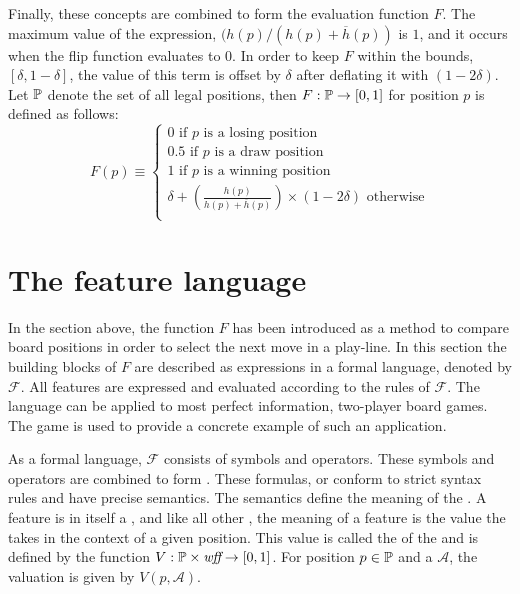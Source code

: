 Finally, these concepts are combined to form the evaluation function $F$.  The maximum value of the expression, $(h(p) / (h(p)+\overline{h}(p))$ is $1$, and it occurs when the flip function evaluates to $0$.  In order to keep $F$ within the bounds, $[\delta,1-\delta]$, the value of this term is offset by $\delta$ after deflating it with $(1 - 2\delta)$.  Let $\mathbb{P}$ denote the set of all legal positions, then $F : \mathbb{P} \rightarrow [0,1]$ for position $p$ is defined as follows:
\begin{equation}
F(p) \equiv \left\{ 
					\begin{array}{l}
						0 \mbox{ if $p$ is a losing position} \\
						0.5 \mbox{ if $p$ is a draw position} \\
						1 \mbox{ if $p$ is a winning position} \\
						 \delta + \left( \frac{h(p)} {h(p)+\overline{h}(p)}\right) \times(1-2\delta) \mbox{ otherwise} \\
					\end{array}
			\right. 
\label{eq:evaluation}
\end{equation}

\section{The feature language}
\label{sec:knowledge-language}
In the section above, the function $F$ has been introduced as a method to compare board positions in order to select the next move in a play-line.  In this section the building blocks of $F$ are described as expressions in a formal language, denoted by $\mathcal{F}$.  All features are expressed and evaluated according to the rules of  $\mathcal{F}$.   The language can be applied to most perfect information, two-player board games.  The game  is used to provide a concrete example of such an application. 

As a formal language, $\mathcal{F}$ consists of symbols and operators.  These symbols and operators are combined to form .  These formulas, or \mywffs{} conform to strict syntax rules and have precise semantics.  The semantics define the meaning of the \mywff.  A feature is in itself a \mywff, and like all other \mywffs, the meaning of a feature is the value the \mywff{} takes in the context of a given position.  This value is called the  of the \mywff{} and is defined by the function $V : \mathbb{P} \times \textit{wff}{} \rightarrow [0,1]$. For position $p \in \mathbb{P}$ and a \mywff{} $\mathcal{A}$, the valuation is given by $V(p,\mathcal{A})$.  

